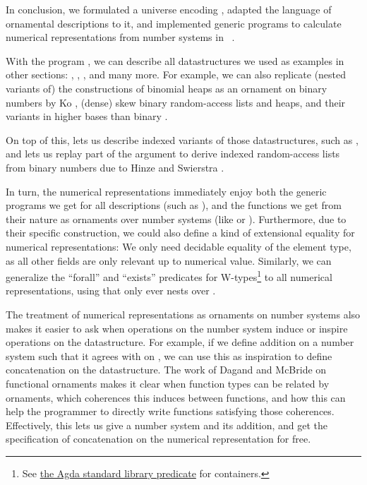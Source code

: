 In conclusion, we formulated a universe encoding , adapted the language of ornamental descriptions  to it, and implemented generic programs to calculate numerical representations from number systems in \ .


With the program , we can describe all datastructures we used as examples in other sections: , , , and many more. For example, we can also replicate (nested variants of) the constructions of binomial heaps as an ornament on binary numbers by Ko \cite{kophd}, (dense) skew binary random-access lists and heaps, and their variants in higher bases than binary \cite{purelyfunctional}. 

On top of this,  lets us describe indexed variants of those datastructures, such as , and lets us replay part of the argument to derive indexed random-access lists from binary numbers due to Hinze and Swierstra \cite{calcdata}.

In turn, the numerical representations immediately enjoy both the generic programs we get for all descriptions (such as ), and the functions we get from their nature as ornaments over number systems (like  or ). Furthermore, due to their specific construction, we could also define a kind of extensional equality for numerical representations: We only need decidable equality of the element type, as all other fields are only relevant up to numerical value. Similarly, we can generalize the ``forall'' and ``exists'' predicates for W-types\footnote{See \href{https://agda.github.io/agda-stdlib/v1.7.3/Data.Container.Relation.Unary.All.html}{the Agda standard library  predicate} for containers.} to all numerical representations, using that  only ever nests over .

The treatment of numerical representations as ornaments on number systems also makes it easier to ask when operations on the number system induce or inspire operations on the datastructure. For example, if we define addition on a number system such that it agrees with \AF{\_+\_} on \bN{}, we can use this as inspiration to define concatenation on the datastructure. The work of Dagand and McBride on functional ornaments \cite{orntrans} makes it clear when function types can be related by ornaments, which coherences this induces between functions, and how this can help the programmer to directly write functions satisfying those coherences. Effectively, this lets us give a number system and its addition, and get the specification of concatenation on the numerical representation for free.

